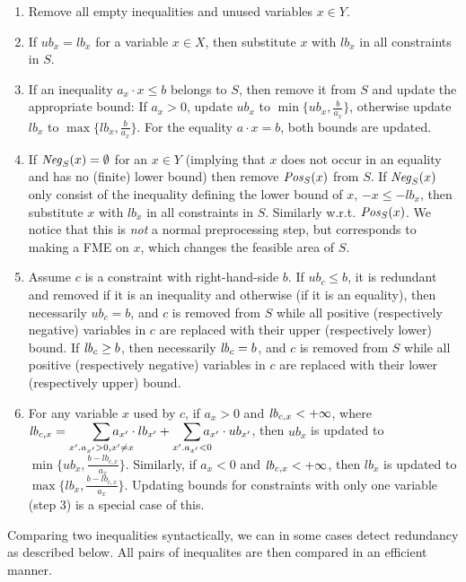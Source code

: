 \begin{enumerate} \itemsep0em
	\item Remove all empty inequalities and unused variables $x\in Y$.
%
	\item If $ub_x = lb_x$ for a variable $x\in X$, then substitute $x$ with $lb_x$ in all constraints in $S$. 
%
	\item If an inequality $a_x\cdot x \leq b$ belongs to $S$, then remove it from $S$ and update the appropriate bound: If $a_x>0$, update $ub_x$ to $\min\{ub_x,\frac{b}{a_x}\}$, otherwise update $lb_x$ to $\max\{lb_x,\frac{b}{a_x}\}$.
For the equality $a\cdot x = b$, both bounds are updated.
%
	\item If $\mathit{Neg}_S(x)=\emptyset$ for an $x\in Y$ (implying that $x$ does not occur in an equality and has no (finite) lower bound) then remove $\mathit{Pos}_S(x)$ from $S$. If $\mathit{Neg}_S(x)$ only consist of the inequality defining the lower bound of $x$, $-x\leq -lb_x$, then substitute $x$ with $lb_x$ in all constraints in $S$. Similarly w.r.t. $\mathit{Pos}_S(x)$. We notice that this is \emph{not} a normal preprocessing step, but corresponds to making a FME on $x$, which changes the feasible area of $S$. 
%
	\item Assume $c$ is a constraint with right-hand-side $b$. If ${ub}_c \leq b$, it is redundant and removed if it is an inequality and otherwise (if it is an equality), then necessarily ${ub}_c = b$, and $c$ is removed from $S$ while all positive (respectively negative) variables in $c$ are replaced with their upper (respectively lower) bound.
If $\mathit{lb}_c \geq b$, then necessarily $\mathit{lb}_c = b$, and $c$ is removed from $S$ while all positive (respectively negative) variables in $c$ are replaced with their lower (respectively upper) bound.
%
	\item For any variable $x$ used by $c$, if $a_x > 0$ and $\mathit{lb}_{c,x}<+\infty$, 
	where $\mi{lb}_{c,x} = \smashoperator[r]{\sum_{x'.a_{x'}>0, x'\neq x}}a_{x'}\cdot lb_{x'} + \smashoperator[r]{\sum_{x'.a_{x'}<0}}a_{x'}\cdot ub_{x'}$, 
	then $ub_x$ is updated to $\min\{ub_x, \frac{b-\mathit{lb}_{c,x}}{a_x}\}$. 
	Similarly, if $a_x < 0$ and $\mathit{lb}_{c,x}<+\infty$, then $lb_x$ is updated to $\max\{lb_x, \frac{b-\mathit{lb}_{c,x}}{a_x}\}$.	
	Updating bounds for constraints with only one variable (step 3) is a special case of this.
\end{enumerate}	
%
Comparing two inequalities syntactically, we can in some cases detect redundancy as described below. All pairs of inequalites are then compared in an efficient manner.
